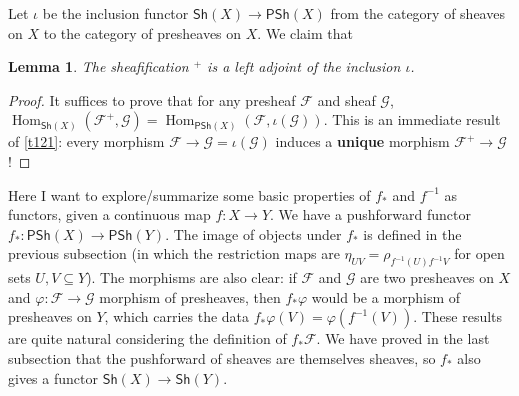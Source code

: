 \documentclass[12pt]{article}
\newtheorem{lemma}{Lemma}[subsection]
\theoremstyle{remark}
\newcommand{\Hom}[0]{\operatorname{Hom}}
\begin{document}
	Let $\iota$ be the inclusion functor $\mathsf{Sh}(X)\to \mathsf{PSh}(X)$ from the category of sheaves on $X$ to the category of presheaves on $X$. We claim that
	\begin{lemma}\label{l141}
		The sheafification ${}^+$ is a left adjoint of the inclusion $\iota$.
	\end{lemma}
	\begin{proof}
		It suffices to prove that for any presheaf $\mathscr F$ and sheaf $\mathscr G$, $\Hom_{\mathsf{Sh}(X)}(\mathscr F^+,\mathscr G)=\Hom_{\mathsf{PSh}(X)}(\mathscr F,\iota(\mathscr G))$. This is an immediate result of \autoref{t121}: every morphism $\mathscr F\to \mathscr G=\iota(\mathscr G)$ induces a \textbf{unique} morphism $\mathscr F^+\to \mathscr G$!
	\end{proof}
	Here I want to explore/summarize some basic properties of $f_*$ and $f^{-1}$ as functors, given a continuous map $f:X\to Y$. We have a pushforward functor $f_*:\mathsf{PSh}(X)\to\mathsf{PSh}(Y)$. The image of objects under $f_*$ is defined in the previous subsection (in which the restriction maps are $\eta_{UV}=\rho_{f^{-1}(U)f^{-1}V}$ for open sets $U, V\subseteq Y$). The morphisms are also clear: if $\mathscr F$ and $\mathscr G$ are two presheaves on $X$ and $\varphi:\mathscr F\to\mathscr G$ morphism of presheaves, then $f_*\varphi$ would be a morphism of presheaves on $Y$, which carries the data $f_*\varphi(V)=\varphi(f^{-1}(V))$. These results are quite natural considering the definition of $f_*\mathscr F$. We have proved in the last subsection that the pushforward of sheaves are themselves sheaves, so $f_*$ also gives a functor $\mathsf{Sh}(X)\to\mathsf{Sh}(Y)$.
\end{document}
